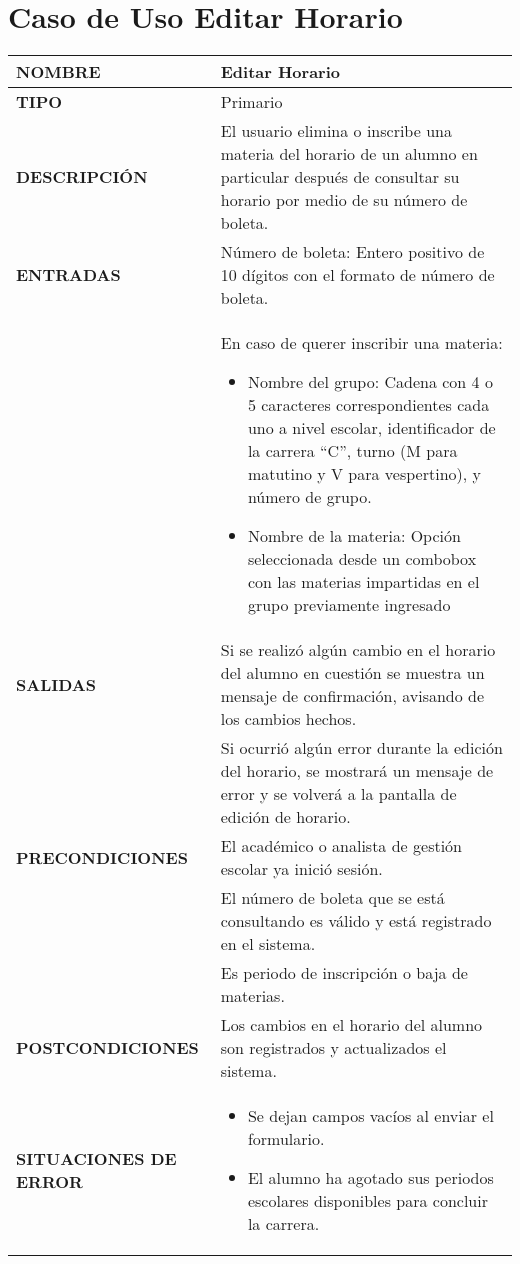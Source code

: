 \newpage
\section{Caso de Uso Editar Horario}
\begin{longtable}{ | p{6cm} | p{10cm} |}
\hline
\textbf{NOMBRE} & Editar Horario\\
\hline
\textbf{TIPO} & Primario\\
\hline
\textbf{DESCRIPCIÓN} & El usuario elimina o inscribe una materia del horario de un alumno en particular después de consultar su horario por medio de su número de boleta.\\
\hline
\textbf{ENTRADAS} & Número de boleta: Entero positivo de 10 dígitos con el formato de número de boleta.\\ & En caso de querer inscribir una materia:\begin{itemize}
    \item Nombre del grupo: Cadena con 4 o 5 caracteres correspondientes cada uno a nivel escolar, identificador de la carrera “C”, turno (M para matutino y V para vespertino), y número de grupo. 
    \item Nombre de la materia: Opción seleccionada desde un combobox con las materias impartidas en el grupo previamente ingresado
\end{itemize}\\
\hline
\textbf{SALIDAS} & Si se realizó algún cambio en el horario del alumno en cuestión se muestra un mensaje de confirmación, avisando de los cambios hechos.\\ & Si ocurrió algún error durante la edición del horario, se mostrará un mensaje de error y se volverá a la pantalla de edición de horario.\\
\hline
\textbf{PRECONDICIONES} & El académico o analista de gestión escolar ya inició sesión.\\ & El número de boleta que se está consultando es válido y está registrado en el sistema.\\ & Es periodo de inscripción o baja de materias.\\
\hline
\textbf{POSTCONDICIONES} & Los cambios en el horario del alumno son registrados y actualizados el sistema.\\
\hline
\textbf{SITUACIONES DE ERROR} & \begin{itemize}
    \item Se dejan campos vacíos al enviar el formulario.
    \item El alumno ha agotado sus periodos escolares disponibles para concluir la carrera.

\end{itemize}
\end{longtable}
